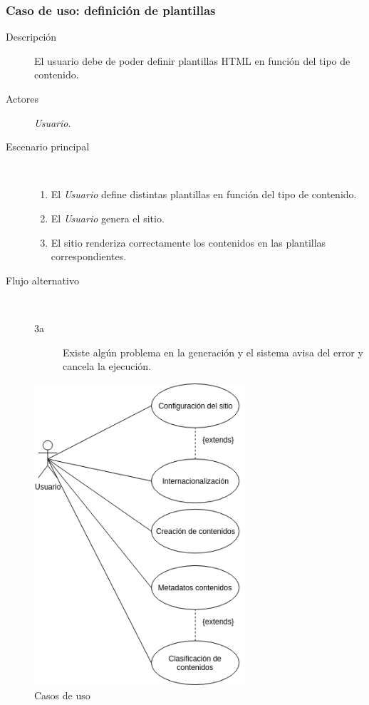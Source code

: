 \subsubsection{Caso de uso: definición de plantillas}

\begin{description}
    \item[Descripción] El usuario debe de poder definir plantillas HTML en función del tipo de contenido.
    \item[Actores] \textit{Usuario}.
    \item[Escenario principal] $\quad$
        \begin{enumerate}
            \item El \textit{Usuario} define distintas plantillas en función del tipo de contenido.
            \item El \textit{Usuario} genera el sitio.
            \item El sitio renderiza correctamente los contenidos en las plantillas correspondientes.
        \end{enumerate}
    \item[Flujo alternativo] $\quad$
        \begin{description}
            \item[3a] Existe algún problema en la generación y el sistema avisa del error
                y cancela la ejecución.
        \end{description}
\end{description}

\begin{figure}[h]
    \centering
    \includegraphics[width=0.7\textwidth]{4_analisis/casos_de_uso}
    \caption{Casos de uso}
    \label{fig:actores}
\end{figure}



